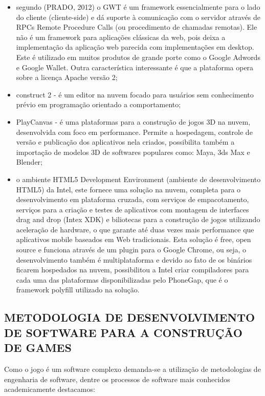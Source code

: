 \documentclass{article}
\begin{document}
\begin{itemize}

    \item segundo (PRADO, 2012) o GWT é um framework essencialmente para o lado do cliente (cliente-side) e dá suporte à comunicação com o servidor através de RPCs Remote Procedure Calls (ou procedimento de chamadas remotas). Ele não é um framework para aplicações clássicas da web, pois deixa a implementação da aplicação web parecida com implementações em desktop. Este é utilizado em muitos produtos de grande porte como o Google Adwords e Google Wallet. Outra característica interessante é que a plataforma opera sobre a licença Apache versão 2;
    \item construct 2 -  é um editor na nuvem focado para usuários sem conhecimento prévio em programação orientado a comportamento;
    \item PlayCanvas - é uma plataformas para a construção de jogos 3D na nuvem, desenvolvida com foco em performance. Permite a hospedagem, controle de versão e publicação dos aplicativos nela criados, possibilita também a importação de modelos 3D de softwares populares como: Maya, 3ds Max e Blender;
    \item o ambiente HTML5 Development Environment (ambiente de desenvolvimento HTML5) da Intel, este fornece uma solução na nuvem, completa para o desenvolvimento em plataforma cruzada, com serviços de empacotamento, serviços para a criação e testes de aplicativos com montagem de interfaces drag and drop (Intex XDK) e biliotecas para a construção de jogos utilizando aceleração de hardware, o que garante até duas vezes mais performance que aplicativos mobile baseados em Web tradicionais. Esta solução é free, open source e funciona  através de um plugin para o Google Chrome, ou seja, o desenvolvimento também é multiplataforma e devido ao fato de os binários ficarem hospedados na nuvem, possibilitou a  Intel criar compiladores para cada uma das plataformas disponibilizadas pelo PhoneGap, que é o framework polyfill utilizado na solução. 
\end{itemize}       

\subsection{METODOLOGIA DE DESENVOLVIMENTO DE SOFTWARE PARA A CONSTRUÇÃO DE GAMES}

Como o jogo é um software complexo demanda-se a utilização de metodologias de engenharia de software, dentre os processos de software mais conhecidos academicamente destacamos: 
\end{document}
